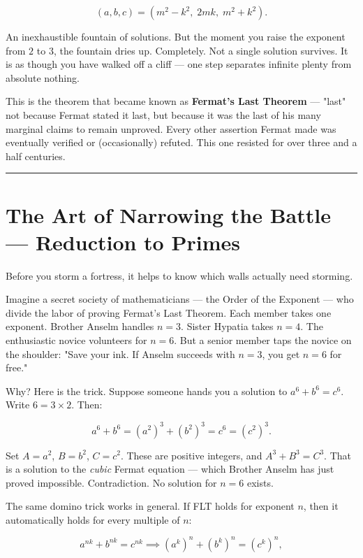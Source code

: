 \documentclass[11pt,openany]{book}
\theoremstyle{definition}
\theoremstyle{plain}
\theoremstyle{remark}
\begin{document}
$$(a, b, c) = (m^2 - k^2,\; 2mk,\; m^2 + k^2).$$

An inexhaustible fountain of solutions. But the moment you raise the exponent from $2$ to $3$, the fountain dries up. Completely. Not a single solution survives. It is as though you have walked off a cliff — one step separates infinite plenty from absolute nothing.

This is the theorem that became known as \textbf{Fermat's Last Theorem} — "last" not because Fermat stated it last, but because it was the last of his many marginal claims to remain unproved. Every other assertion Fermat made was eventually verified or (occasionally) refuted. This one resisted for over three and a half centuries.

\bigskip\noindent\rule{\textwidth}{0.4pt}\bigskip


\section*{The Art of Narrowing the Battle — Reduction to Primes}


Before you storm a fortress, it helps to know which walls actually need storming.

Imagine a secret society of mathematicians — the Order of the Exponent — who divide the labor of proving Fermat's Last Theorem. Each member takes one exponent. Brother Anselm handles $n = 3$. Sister Hypatia takes $n = 4$. The enthusiastic novice volunteers for $n = 6$. But a senior member taps the novice on the shoulder: "Save your ink. If Anselm succeeds with $n = 3$, you get $n = 6$ for free."

Why? Here is the trick. Suppose someone hands you a solution to $a^6 + b^6 = c^6$. Write $6 = 3 \times 2$. Then:

$$a^6 + b^6 = (a^2)^3 + (b^2)^3 = c^6 = (c^2)^3.$$

Set $A = a^2$, $B = b^2$, $C = c^2$. These are positive integers, and $A^3 + B^3 = C^3$. That is a solution to the \textit{cubic} Fermat equation — which Brother Anselm has just proved impossible. Contradiction. No solution for $n = 6$ exists.

The same domino trick works in general. If FLT holds for exponent $n$, then it automatically holds for every multiple of $n$:

$$a^{nk} + b^{nk} = c^{nk} \implies (a^k)^n + (b^k)^n = (c^k)^n,$$
\end{document}
